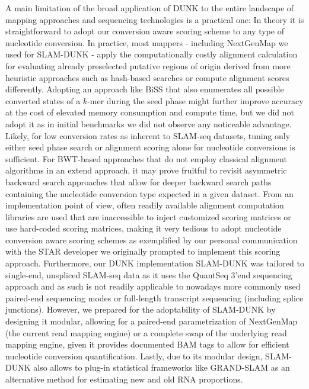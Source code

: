 A main limitation of the broad application of DUNK to the entire landscape of mapping approaches and sequencing technologies is a practical one: In theory it is straightforward to adopt our conversion aware scoring scheme to any type of nucleotide conversion. In practice, most mappers - including NextGenMap we used for SLAM-DUNK - apply the computationally costly alignment calculation for evaluating already preselected putative regions of origin derived from more heuristic approaches such as hash-based searches or compute alignment scores differently. Adopting an approach like BiSS that also enumerates all possible converted states of a $k$-mer during the seed phase might further improve accuracy at the cost of elevated memory consumption and compute time, but we did not adopt it as in initial benchmarks we did not observe any noticeable advantage. Likely, for low conversion rates as inherent to SLAM-seq datasets, tuning only either seed phase search or alignment scoring alone for nucleotide conversions is sufficient. For BWT-based approaches that do not employ classical alignment algorithms in an extend approach, it may prove fruitful to revisit asymmetric backward search approaches that allow for deeper backward search paths containing the nucleotide conversion type expected in a given dataset. From an implementation point of view, often readily available alignment computation libraries are used that are inaccessible to inject customized scoring matrices or use hard-coded scoring matrices, making it very tedious to adopt nucleotide conversion aware scoring schemes as exemplified by our personal communication with the STAR developer we originally prompted to implement this scoring approach. Furthermore, our DUNK implementation SLAM-DUNK was tailored to single-end, unspliced SLAM-seq data as it uses the QuantSeq 3'end sequencing approach and as such is not readily applicable to nowadays more commonly used paired-end sequencing modes or full-length transcript sequencing (including splice junctions). However, we prepared for the adoptability of SLAM-DUNK by designing it modular, allowing for a paired-end parametrization of NextGenMap (the current read mapping engine) or a complete swap of the underlying read mapping engine, given it provides documented BAM tags to allow for efficient nucleotide conversion quantification. Lastly, due to its modular design, SLAM-DUNK also allows to plug-in statistical frameworks like GRAND-SLAM \citep{Juerges2018} as an alternative method for estimating new and old RNA proportions.  \\
